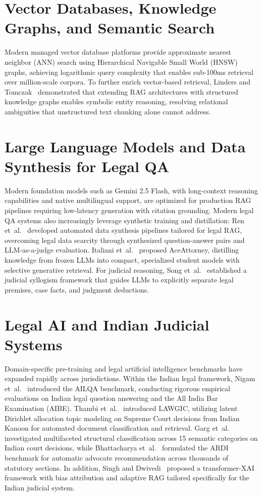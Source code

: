 \documentclass[12pt,a4paper]{report}
\begin{document}
\section{Vector Databases, Knowledge Graphs, and Semantic Search}
Modern managed vector database platforms provide approximate nearest neighbor (ANN) search using Hierarchical Navigable Small World (HNSW) graphs, achieving logarithmic query complexity that enables sub-100ms retrieval over million-scale corpora. To further enrich vector-based retrieval, Linders and Tomczak~\cite{ref_linders2025_kg_rag} demonstrated that extending RAG architectures with structured knowledge graphs enables symbolic entity reasoning, resolving relational ambiguities that unstructured text chunking alone cannot address.

\section{Large Language Models and Data Synthesis for Legal QA}
Modern foundation models such as Gemini 2.5 Flash, with long-context reasoning capabilities and native multilingual support, are optimized for production RAG pipelines requiring low-latency generation with citation grounding. Modern legal QA systems also increasingly leverage synthetic training and distillation: Ren et~al.~\cite{ref_ren2026_autodata} developed automated data synthesis pipelines tailored for legal RAG, overcoming legal data scarcity through synthesized question-answer pairs and LLM-as-a-judge evaluation. Italiani et~al.~\cite{ref_italiani2025_enhancing} proposed AceAttorney, distilling knowledge from frozen LLMs into compact, specialized student models with selective generative retrieval. For judicial reasoning, Song et~al.~\cite{ref_song2025_summarization} established a judicial syllogism framework that guides LLMs to explicitly separate legal premises, case facts, and judgment deductions.

\section{Legal AI and Indian Judicial Systems}
Domain-specific pre-training and legal artificial intelligence benchmarks have expanded rapidly across jurisdictions. Within the Indian legal framework, Nigam et~al.~\cite{ref_nigam2026_ailqa} introduced the AILQA benchmark, conducting rigorous empirical evaluations on Indian legal question answering and the All India Bar Examination (AIBE). Thambi et~al.~\cite{ref_thambi2024_lawgic} introduced LAWGIC, utilizing latent Dirichlet allocation topic modeling on Supreme Court decisions from Indian Kanoon for automated document classification and retrieval. Garg et~al.~\cite{ref_garg2026_multifaceted} investigated multifaceted structural classification across 15 semantic categories on Indian court decisions, while Bhattacharya et~al.~\cite{ref_bhattacharya2025_ardi} formulated the ARDI benchmark for automatic advocate recommendation across thousands of statutory sections. In addition, Singh and Dwivedi~\cite{ref_singh2026_transformer_xai} proposed a transformer-XAI framework with bias attribution and adaptive RAG tailored specifically for the Indian judicial system.
\end{document}
